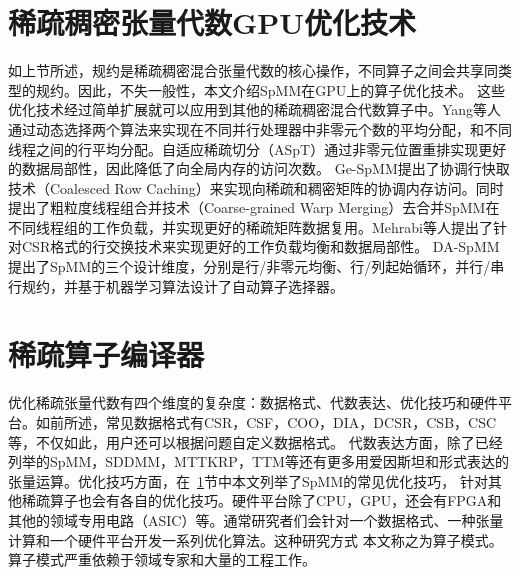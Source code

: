 \section{稀疏稠密张量代数GPU优化技术}\label{sec:spmmopt}
如上节所述，规约是稀疏稠密混合张量代数的核心操作，不同算子之间会共享同类型的规约。因此，不失一般性，本文介绍SpMM在GPU上的算子优化技术。
这些优化技术经过简单扩展就可以应用到其他的稀疏稠密混合代数算子中。Yang等人\cite{yang2018design}通过动态选择两个算法来实现在不同并行处理器中非零元个数的平均分配，和不同线程之间的行平均分配。自适应稀疏切分（ASpT）\cite{hong2019adaptive}通过非零元位置重排实现更好的数据局部性，因此降低了向全局内存的访问次数。
Ge-SpMM\cite{huang2020ge}提出了协调行快取技术（Coalesced Row Caching）来实现向稀疏和稠密矩阵的协调内存访问。同时提出了粗粒度线程组合并技术（Coarse-grained Warp Merging）去合并SpMM在不同线程组的工作负载，并实现更好的稀疏矩阵数据复用。Mehrabi等人\cite{mehrabi2021learning}提出了针对CSR格式的行交换技术来实现更好的工作负载均衡和数据局部性。
DA-SpMM\cite{dai2022heuristic}提出了SpMM的三个设计维度，分别是行/非零元均衡、行/列起始循环，并行/串行规约，并基于机器学习算法设计了自动算子选择器。

\section{稀疏算子编译器}
优化稀疏张量代数有四个维度的复杂度：数据格式、代数表达、优化技巧和硬件平台。如前所述，常见数据格式有CSR，CSF，COO，DIA，DCSR，CSB，CSC等，不仅如此，用户还可以根据问题自定义数据格式。
代数表达方面，除了已经列举的SpMM，SDDMM，MTTKRP，TTM等还有更多用爱因斯坦和\cite{einsteinsum}形式表达的张量运算。优化技巧方面，在~\ref{sec:spmmopt}节中本文列举了SpMM的常见优化技巧，
针对其他稀疏算子也会有各自的优化技巧。硬件平台除了CPU，GPU，还会有FPGA和其他的领域专用电路（ASIC）等。通常研究者们会针对一个数据格式、一种张量计算和一个硬件平台开发一系列优化算法。这种研究方式
本文称之为算子模式。算子模式严重依赖于领域专家和大量的工程工作\cite{wang2014mkl,naumov2010cusparse,guennebaud2010eigen}。

